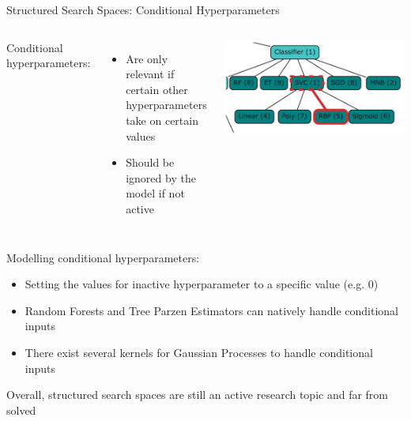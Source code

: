 \begin{frame}[c]{Structured Search Spaces: Conditional Hyperparameters}


\begin{columns}[T]
\vspace*{0.2cm}
Conditional hyperparameters:
\begin{itemize}
    \item Are \alert{only relevant if} certain other hyperparameters take on certain values
    \item \alert{Should be ignored} by the model \alert{if not active}
\end{itemize}

\vspace{0.5cm}
\includegraphics[width=1\textwidth]{images/categ_cond_params/conditional.png}
%
\end{columns}

\pause 
\vspace*{-0.2cm}
Modelling conditional hyperparameters:
\begin{itemize}
    \item Setting the values for inactive hyperparameter to a specific value (e.g. $0$)
    \item Random Forests  and Tree Parzen Estimators  can \alert{natively} handle conditional inputs
    \item There exist \alert{several kernels for Gaussian Processes} to handle conditional inputs    
\end{itemize}
%
\pause
\vspace{0.4cm}
Overall, structured search spaces are \alert{still an active research topic} and far from solved
\end{frame}

